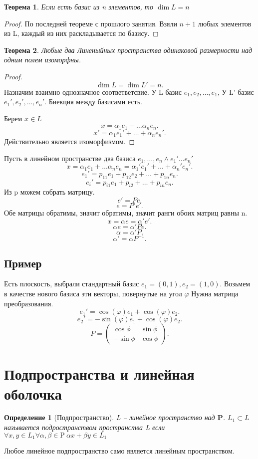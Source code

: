 \documentclass{scrartcl}
\newtheorem{theorem}{Теорема}
\newtheorem{definition}{Определение}
\begin{document}
\begin{theorem}
	Если есть базис из n элементов, то $\dim{L} = n$
\end{theorem}
\begin{proof}
	По последней теореме с прошлого занятия. Взяли $n + 1$ любых элементов из L, каждый из них раскладывается по базису.
\end{proof}
\begin{theorem}
	Любые два Линеныйных пространства одинаковой размерности над одним полем изоморфны.
\end{theorem}
\begin{proof}
	\[
		\dim{L} = \dim{L'} = n
		.\]
	Назначим взаимно однозначное соответветсвие. У L базис $e_1,e_2,\dots,e_1$, У L' базис $e_1',e_2',\dots,e_{n}'$. Биекция между базисами есть.

	Берем $x \in L$
	\[
		x = \alpha_1 e_1 + \dots \alpha_{n} e_{n}
		.\]
	\[
		x' = \alpha_{1} e_1' + \dots + \alpha_{n}e_{n}'
		.\]
	Действительно является изоморфизмом.
\end{proof}
Пусть в линейном пространстве два базиса $e_1,\dots,e_{n} \land e_1'\dots e_{n}'$
\[
	x = \alpha_{1}e_1 + \dots \alpha_{n} e_{n} = \alpha_1'e_1' + \dots + \alpha_{n}' e_{n}'
	.\]
\[
	e_1' = p_{11}e_1 + p_{12}e_2 + \dots + p_{1n}e_{n}
	.\]
\[
	e_{i}' = p_{i1}e_1 + p_{i2} + \dots + p_{in}e_{n}
	.\]
Из p можем собрать матрицу.
\[
	e' = P e
	.\]
\[
	e = P'e'
	.\]
Обе матрицы обратимы, значит обратимы, значит ранги обоих матриц равны n.
\[
	x = \alpha e = \alpha' e'
	.\]
\[
	\alpha e = \alpha' P e
	.\]
\[
	\alpha = \alpha' P
	.\]
\[
	\alpha' = \alpha P^{-1}
	.\]
\subsection{Пример}
Есть плоскость, выбрали стандартный базис $e_1 = (0,1), e_2 = (1,0)$. Возьмем в качестве нового базиса эти векторы, повернутые на угол  $\varphi$
Нужна матрица преобразования.
\[
	e_1' = \cos{( \varphi )} e_1 + \cos{( \varphi )} e_2
	.\]
\[
	e_2' = -\sin{(\varphi)} e_1 + \cos{(\varphi)} e_2
	.\]
\[
	P =
	\begin{pmatrix}
		\cos{\phi}  & \sin{\phi} \\
		-\sin{\phi} & \cos{\phi}
	\end{pmatrix}
	.\]
\section{Подпространства и линейная оболочка}
\begin{definition}[Подпространство]
	L -- линейное пространство над $\mathbf{P}$.  $L_1 \subset L$ называется подространством пространства L если $\forall  x, y \in L_1 \forall  \alpha,\beta \in \mathrm{P}
		~ \alpha x + \beta y \in L_1$
\end{definition}
Любое линейное подпространство само является линейным пространством.
\end{document}
